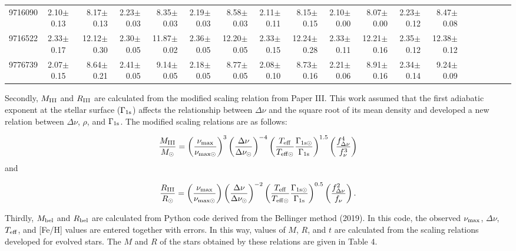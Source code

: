 \documentclass[a4paper,fleqn,usenatbib]{mnras}     %
\begin{document}
{\begin{table*}
{\begin{tabular}{lcrrrrrrrrrrrrrrrrr}
9716090&2.10$\pm$0.13&8.17$\pm$0.13&2.23$\pm$0.03&8.35$\pm$0.03&2.19$\pm$0.03&8.58$\pm$0.03&2.11$\pm$0.11&8.15$\pm$0.15&2.10$\pm$0.00&8.07$\pm$0.00&2.23$\pm$0.12&8.47$\pm$0.08\\[2pt]
9716522&2.33$\pm$0.17&12.12$\pm$0.30&2.30$\pm$0.05&11.87$\pm$0.02&2.36$\pm$0.05&12.20$\pm$0.05&2.33$\pm$0.15&12.24$\pm$0.28&2.33$\pm$0.11&12.21$\pm$0.16&2.35$\pm$0.12&12.38$\pm$0.12\\[2pt]
9776739&2.07$\pm$0.15&8.64$\pm$0.21&2.41$\pm$0.05&9.14$\pm$0.05&2.18$\pm$0.05&8.77$\pm$0.05&2.08$\pm$0.10&8.73$\pm$0.16&2.21$\pm$0.06&8.91$\pm$0.16&2.34$\pm$0.14&9.24$\pm$0.09\\[2pt]
               \hline
        \end{tabular}
}
\end{table*}


Secondly, $M_{\rm III}$ and $R_{\rm III}$ are calculated from the modified scaling relation from Paper III. %
This work assumed that 
the first adiabatic exponent at the stellar surface 
(${\Gamma_{\rm 1s}}$) affects 
the relationship 
between ${\Delta\nu}$ and the square root of its mean density 
and developed a new relation between 
$\Delta\nu$, $\rho$, and ${\Gamma_{\rm 1s}}$.
The modified scaling relations are
as follows:

\begin{equation}
\frac{M_{\rm III}}{M_{\rm \odot}}= \left(\frac{\nu_{\rm max}}{\nu_{\rm max\odot}}\right)^3\left(\frac{{{\Delta\nu_{\rm }}}}{{{\Delta\nu_{\rm \odot}}}}\right)^{-4}\left(\frac{T_{\rm eff}}{T_{\rm eff \odot}}\frac{\Gamma_{\rm 1s \odot}}{\Gamma_{\rm 1s}}\right)^{1.5}\left(\frac{f^{4}_{\rm {\Delta\nu}}}{f^{3}_{\rm {\nu}}}\right)
\end{equation}
and

\begin{equation}
\frac{R_{\rm III}}{R_{\rm \odot}}= \left(\frac{\nu_{\rm max}}{\nu_{\rm max\odot}}\right)\left(\frac{{{\Delta\nu_{\rm }}}}{{{\Delta\nu_{\rm \odot}}}}\right)^{-2}\left(\frac{T_{\rm eff}}{T_{\rm eff \odot}}\frac{\Gamma_{\rm 1s \odot}}{\Gamma_{\rm 1s}}\right)^{0.5}\left(\frac{f^{2}_{\rm {\Delta\nu}}}{f_{\rm {\nu}}}\right).
\end{equation}

Thirdly, $M_{\rm bel}$ and $R_{\rm bel}$ are calculated from Python code derived from the Bellinger method (2019). 
In this code, the observed ${\nu_{\rm max}}$, ${\Delta\nu}$, ${T_{\rm eff}}$,
 and [Fe/H] values are entered together with errors.
In this way, values of  $M$, $R$, and $t$ are calculated from the 
scaling relations developed for evolved stars.
The $M$ and $R$ of the stars obtained by these relations are given in Table 4.

}
\end{document}

